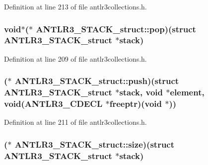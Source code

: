 Definition at line 213 of file antlr3collections.\-h.

\hypertarget{struct_a_n_t_l_r3___s_t_a_c_k__struct_af6f34d7b0370a403361cffd66639e58b}{
\subsubsection[{pop}]{\setlength{\rightskip}{0pt plus 5cm}void$\ast$($\ast$ A\-N\-T\-L\-R3\-\_\-\-S\-T\-A\-C\-K\-\_\-struct\-::pop)(struct {\bf A\-N\-T\-L\-R3\-\_\-\-S\-T\-A\-C\-K\-\_\-struct} $\ast$stack)}}\label{struct_a_n_t_l_r3___s_t_a_c_k__struct_af6f34d7b0370a403361cffd66639e58b}


Definition at line 209 of file antlr3collections.\-h.

\hypertarget{struct_a_n_t_l_r3___s_t_a_c_k__struct_af4d50fc3d9f2b68eb22585d989777fb7}{
\subsubsection[{push}]{($\ast$ A\-N\-T\-L\-R3\-\_\-\-S\-T\-A\-C\-K\-\_\-struct\-::push)(struct {\bf A\-N\-T\-L\-R3\-\_\-\-S\-T\-A\-C\-K\-\_\-struct} $\ast$stack, void $\ast$element, void({\bf A\-N\-T\-L\-R3\-\_\-\-C\-D\-E\-C\-L} $\ast$freeptr)(void $\ast$))}}\label{struct_a_n_t_l_r3___s_t_a_c_k__struct_af4d50fc3d9f2b68eb22585d989777fb7}


Definition at line 211 of file antlr3collections.\-h.

\hypertarget{struct_a_n_t_l_r3___s_t_a_c_k__struct_a19154ad0a9501404724b051b430f16a6}{
\subsubsection[{size}]{($\ast$ A\-N\-T\-L\-R3\-\_\-\-S\-T\-A\-C\-K\-\_\-struct\-::size)(struct {\bf A\-N\-T\-L\-R3\-\_\-\-S\-T\-A\-C\-K\-\_\-struct} $\ast$stack)}}\label{struct_a_n_t_l_r3___s_t_a_c_k__struct_a19154ad0a9501404724b051b430f16a6}


